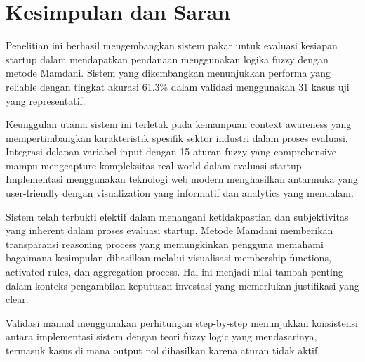 \documentclass[12pt,a4paper]{article}
\begin{document}
\section{Kesimpulan dan Saran}

Penelitian ini berhasil mengembangkan sistem pakar untuk evaluasi kesiapan startup dalam mendapatkan pendanaan menggunakan logika fuzzy dengan metode Mamdani. Sistem yang dikembangkan menunjukkan performa yang reliable dengan tingkat akurasi 61.3\% dalam validasi menggunakan 31 kasus uji yang representatif.

Keunggulan utama sistem ini terletak pada kemampuan context awareness yang mempertimbangkan karakteristik spesifik sektor industri dalam proses evaluasi. Integrasi delapan variabel input dengan 15 aturan fuzzy yang comprehensive mampu mengcapture kompleksitas real-world dalam evaluasi startup. Implementasi menggunakan teknologi web modern menghasilkan antarmuka yang user-friendly dengan visualization yang informatif dan analytics yang mendalam.

Sistem telah terbukti efektif dalam menangani ketidakpastian dan subjektivitas yang inherent dalam proses evaluasi startup. Metode Mamdani memberikan transparansi reasoning process yang memungkinkan pengguna memahami bagaimana kesimpulan dihasilkan melalui visualisasi membership functions, activated rules, dan aggregation process. Hal ini menjadi nilai tambah penting dalam konteks pengambilan keputusan investasi yang memerlukan justifikasi yang clear.

Validasi manual menggunakan perhitungan step-by-step menunjukkan konsistensi antara implementasi sistem dengan teori fuzzy logic yang mendasarinya, termasuk kasus di mana output nol dihasilkan karena aturan tidak aktif.
\end{document}
